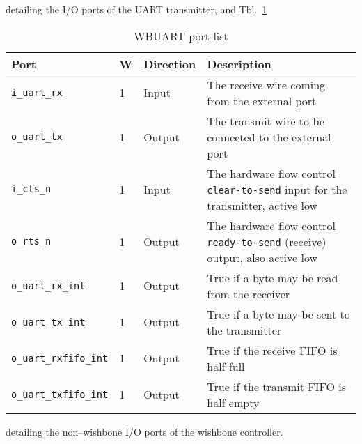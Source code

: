 \documentclass{gqtekspec}
\begin{document}
detailing the I/O ports of the UART transmitter, and Tbl.~\ref{tbl:wbports}
\begin{table}\begin{center}\begin{tabular}{|p{1.15in}|p{0.1in}|p{0.75in}|p{3.375in}|}
\rowcolor[gray]{0.85} Port & W & Direction & Description \\\hline\hline
{\tt i\_uart\_rx}& 1 & Input & The receive wire coming from the external port\\\hline
{\tt o\_uart\_tx}& 1 & Output & The transmit wire to be connected to the external port\\\hline
{\tt i\_cts\_n}& 1 & Input  & The hardware flow control {\tt clear-to-send} input for the transmitter, active low\\\hline
{\tt o\_rts\_n}& 1 & Output & The hardware flow control {\tt ready-to-send} (receive) output, also active low\\\hline
{\tt o\_uart\_rx\_int}	& 1 & Output & True if a byte may be read from the receiver\\\hline
{\tt o\_uart\_tx\_int}	& 1 & Output & True if a byte may be sent to the transmitter\\\hline
{\tt o\_uart\_rxfifo\_int}&1& Output & True if the receive FIFO is half full\\\hline
{\tt o\_uart\_txfifo\_int}&1& Output & True if the transmit FIFO is half empty\\\hline
\end{tabular}\caption{WBUART port list}\label{tbl:wbports}
\end{center}\end{table}
detailing the non--wishbone I/O ports of the wishbone controller.



\end{document}
